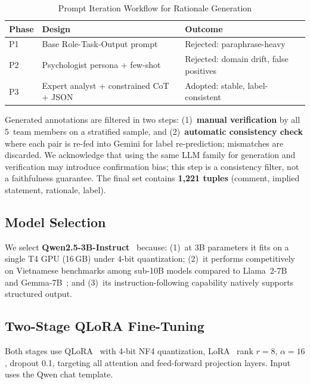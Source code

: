 \documentclass[conference]{IEEEtran}
\begin{document}
\begin{table}[t]
\centering
\caption{Prompt Iteration Workflow for Rationale Generation}
\label{tab:prompt_workflow}
\scriptsize
\setlength{\tabcolsep}{3pt}
\begin{tabular}{p{1.3cm}p{2.2cm}p{2.1cm}}
\toprule
\textbf{Phase} & \textbf{Design} & \textbf{Outcome} \\
\midrule
P1 & Base Role-Task-Output prompt & Rejected: paraphrase-heavy \\
P2 & Psychologist persona + few-shot & Rejected: domain drift, false positives \\
P3 & Expert analyst + constrained CoT + JSON & Adopted: stable, label-consistent \\
\bottomrule
\end{tabular}
\end{table}

Generated annotations are filtered in two steps: (1)~\textbf{manual
verification} by all 5~team members on a stratified sample, and
(2)~\textbf{automatic consistency check} where each pair is re-fed into Gemini
for label re-prediction; mismatches are discarded. We acknowledge that using the
same LLM family for generation and verification may introduce confirmation bias;
this step is a consistency filter, not a faithfulness guarantee. The final set
contains \textbf{1,221 tuples} (comment, implied statement, rationale, label).

\subsection{Model Selection}

We select \textbf{Qwen2.5-3B-Instruct}~\cite{Yang2025Qwen25} because: (1)~at
3B parameters it fits on a single T4 GPU (16\,GB) under 4-bit quantization;
(2)~it performs competitively on Vietnamese benchmarks among sub-10B models
compared to Llama~2-7B~\cite{llama} and Gemma-7B~\cite{Mesnard2024Gemma}; and
(3)~its instruction-following capability natively supports structured output.

\subsection{Two-Stage QLoRA Fine-Tuning}

Both stages use QLoRA~\cite{Dettmers2023QLoRA} with 4-bit NF4 quantization,
LoRA~\cite{Hu2022LoRA} rank $r{=}8$, $\alpha{=}16$, dropout 0.1, targeting all
attention and feed-forward projection layers. Input uses the Qwen chat template.
\end{document}

